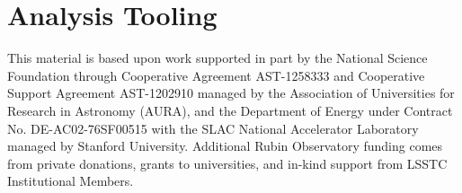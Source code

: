 \documentclass[twocolumn,longbib]{aastex7}
\begin{document}








\section{Analysis Tooling}
\label{sec:analysis}







\begin{acknowledgments}
This material is based upon work supported in part by the National Science Foundation through Cooperative Agreement AST-1258333 and Cooperative Support Agreement AST-1202910 managed by the Association of Universities for Research in Astronomy (AURA), and the Department of Energy under Contract No. DE-AC02-76SF00515 with the SLAC National Accelerator Laboratory managed by Stanford University.
Additional Rubin Observatory funding comes from private donations, grants to universities, and in-kind support from LSSTC Institutional Members.
\end{acknowledgments}





\appendix
\twocolumngrid

\end{document}
